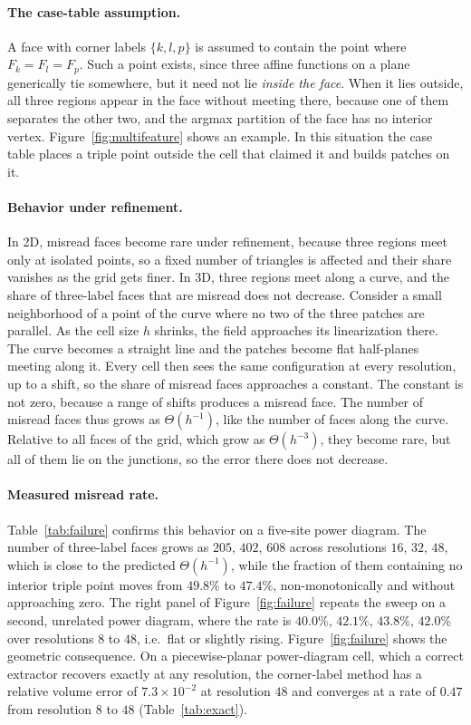 \documentclass{egpubl}
\theoremstyle{definition}
\newcommand{\interp}{F}
\begin{document}
\paragraph{The case-table assumption.} A face with corner labels $\{k,l,p\}$
is assumed to contain the point where $\interp_k = \interp_l = \interp_p$.
Such a point exists, since three affine functions on a plane generically tie
somewhere, but it need not lie \emph{inside the face}. When it lies outside,
all three regions appear in the face without meeting there, because one of
them separates the other two, and the argmax partition of the face has no
interior vertex. Figure~\ref{fig:multifeature} shows an example. In this situation the
case table places a triple point outside the cell that claimed it and builds
patches on it.

\paragraph{Behavior under refinement.} In 2D, misread faces become rare
under refinement, because three regions meet only at isolated points, so a
fixed number of triangles is affected and their share vanishes as the grid
gets finer. In 3D, three regions meet along a curve, and the share of
three-label faces that are misread does not decrease. Consider a small
neighborhood of a point of the curve where no two of the three patches are
parallel. As the cell size $h$ shrinks, the field approaches its
linearization there. The curve becomes a straight line and the patches become
flat half-planes meeting along it. Every cell then sees the same
configuration at every resolution, up to a shift, so the share of misread
faces approaches a constant. The constant is not zero, because a range of
shifts produces a misread face. The number of misread faces thus grows as
$\Theta(h^{-1})$, like the number of faces along the curve. Relative to all
faces of the grid, which grow as $\Theta(h^{-3})$, they become rare, but all
of them lie on the junctions, so the error there does not decrease.

\paragraph{Measured misread rate.} Table~\ref{tab:failure} confirms this
behavior on a five-site power diagram. The number of three-label faces grows
as $205$, $402$, $608$ across resolutions $16$, $32$, $48$, which is close to
the predicted $\Theta(h^{-1})$, while the fraction of them containing no
interior triple point moves from $49.8\%$ to $47.4\%$, non-monotonically and
without approaching zero. The right panel of Figure~\ref{fig:failure} repeats
the sweep on a second, unrelated power diagram, where the rate is $40.0\%$,
$42.1\%$, $43.8\%$, $42.0\%$ over resolutions $8$ to $48$, i.e.\ flat or
slightly rising. Figure~\ref{fig:failure} shows the geometric consequence.
On a piecewise-planar power-diagram cell, which a correct extractor recovers
exactly at any resolution, the corner-label method has a relative volume
error of $7.3\times10^{-2}$ at resolution $48$ and converges at a rate of
$0.47$ from resolution $8$ to $48$ (Table~\ref{tab:exact}).
\end{document}
